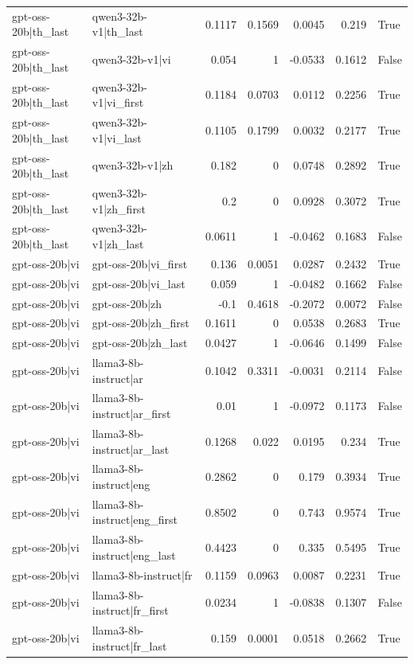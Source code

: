 \begin{table}
\begin{tabular}{l l r r r r l}
gpt-oss-20b|th_last & qwen3-32b-v1|th_last & 0.1117 & 0.1569 & 0.0045 & 0.219 & True \\
gpt-oss-20b|th_last & qwen3-32b-v1|vi & 0.054 & 1 & -0.0533 & 0.1612 & False \\
gpt-oss-20b|th_last & qwen3-32b-v1|vi_first & 0.1184 & 0.0703 & 0.0112 & 0.2256 & True \\
gpt-oss-20b|th_last & qwen3-32b-v1|vi_last & 0.1105 & 0.1799 & 0.0032 & 0.2177 & True \\
gpt-oss-20b|th_last & qwen3-32b-v1|zh & 0.182 & 0 & 0.0748 & 0.2892 & True \\
gpt-oss-20b|th_last & qwen3-32b-v1|zh_first & 0.2 & 0 & 0.0928 & 0.3072 & True \\
gpt-oss-20b|th_last & qwen3-32b-v1|zh_last & 0.0611 & 1 & -0.0462 & 0.1683 & False \\
gpt-oss-20b|vi & gpt-oss-20b|vi_first & 0.136 & 0.0051 & 0.0287 & 0.2432 & True \\
gpt-oss-20b|vi & gpt-oss-20b|vi_last & 0.059 & 1 & -0.0482 & 0.1662 & False \\
gpt-oss-20b|vi & gpt-oss-20b|zh & -0.1 & 0.4618 & -0.2072 & 0.0072 & False \\
gpt-oss-20b|vi & gpt-oss-20b|zh_first & 0.1611 & 0 & 0.0538 & 0.2683 & True \\
gpt-oss-20b|vi & gpt-oss-20b|zh_last & 0.0427 & 1 & -0.0646 & 0.1499 & False \\
gpt-oss-20b|vi & llama3-8b-instruct|ar & 0.1042 & 0.3311 & -0.0031 & 0.2114 & False \\
gpt-oss-20b|vi & llama3-8b-instruct|ar_first & 0.01 & 1 & -0.0972 & 0.1173 & False \\
gpt-oss-20b|vi & llama3-8b-instruct|ar_last & 0.1268 & 0.022 & 0.0195 & 0.234 & True \\
gpt-oss-20b|vi & llama3-8b-instruct|eng & 0.2862 & 0 & 0.179 & 0.3934 & True \\
gpt-oss-20b|vi & llama3-8b-instruct|eng_first & 0.8502 & 0 & 0.743 & 0.9574 & True \\
gpt-oss-20b|vi & llama3-8b-instruct|eng_last & 0.4423 & 0 & 0.335 & 0.5495 & True \\
gpt-oss-20b|vi & llama3-8b-instruct|fr & 0.1159 & 0.0963 & 0.0087 & 0.2231 & True \\
gpt-oss-20b|vi & llama3-8b-instruct|fr_first & 0.0234 & 1 & -0.0838 & 0.1307 & False \\
gpt-oss-20b|vi & llama3-8b-instruct|fr_last & 0.159 & 0.0001 & 0.0518 & 0.2662 & True \\

\end{tabular}
\end{table}
